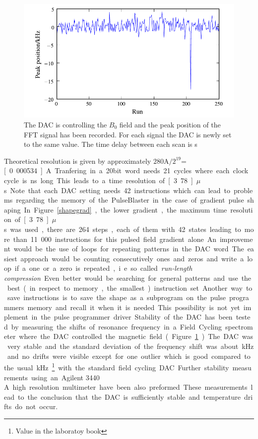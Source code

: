 \documentclass[12pt, a4paper, BCOR10mm, twoside, titlepage, headinclude]{scrbook}
\begin{document}
\begin{figure}[ht]
\centering
\includegraphics[]{dac_fc}
\caption{The DAC is controlling the $B_{0}$ field and the peak position of the FFT signal has been recorded. For each signal the DAC is newly set to the same value. The time delay between each scan is \unit[50]{s} }
\label{gradstability}
\end{figure}
Theoretical resolution is given by approximately $\textrm{280A}/\textrm{2}^{\textrm{19}}$=\unit[0.000534]{A}. Tranfering in a 20bit word needs 21 cycles where each clock cycle is \unit[180]{ns} long. This leads to a time resolution of \unit[3.78]{$\mu$s}. Note that each DAC setting needs 42 instructions which can lead to problems regarding the memory of the PulseBlaster in the case of gradient pulse shaping. In Figure \ref{shapegrad},  the lower gradient, the maximum time resolution of \unit[3.78]{$\mu$s} was used, there are 264 steps, each of them with 42 states leading to more than 11.000 instructions for this pulsed field gradient alone. 

An improvement would be the use of loops for repeating patterns in the DAC word. The easiest approach would be  counting consecutively ones and zeros and write a loop if a one or a zero is repeated, i.e. so called \emph{run-length compression}. Even better would be searching for general patterns and use the best (in respect to memory, the smallest) instruction set. Another way to save instructions is to save the shape as a subprogram on the pulse programmers memory and recall it when it is needed. This possibility is not yet implement in the pulse programmer driver.

Stability of the DAC has been tested by measuring the shifts of resonance frequency in a Field Cycling spectrometer where the DAC controlled the magnetic field (Figure \ref{gradstability}). The DAC was very stable and the standard deviation of the frequency shift was about \unit[3]{kHz} and no drifts were visible except for one outlier which is good compared to the usual \unit[6]{kHz}\footnote{Value in the laboratoy book} with the standard field cycling DAC. Further stability measurements using an \textsf{Agilent 3440 A} high resolution multimeter have been also preformed. These measurements lead to the conclusion that the DAC is sufficiently stable and temperature drifts do not occur.
\end{document}
